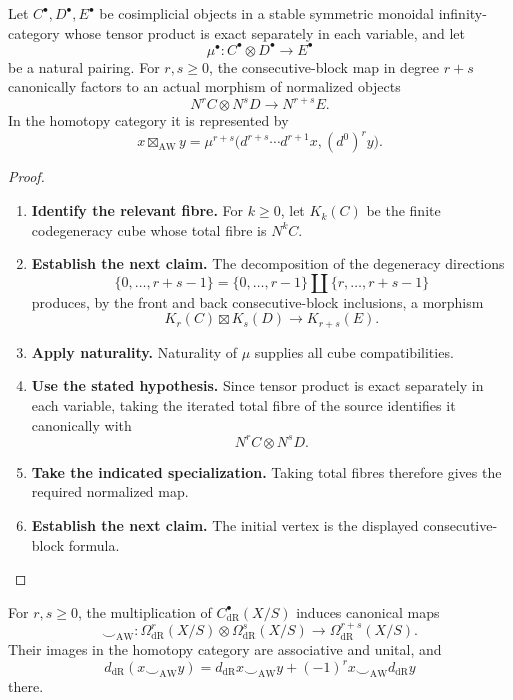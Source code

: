 \begin{lemma}
\label{lem:consecutive-block-factorization}
Let \(C^\bullet,D^\bullet,E^\bullet\) be cosimplicial objects in a stable symmetric
monoidal infinity-category whose tensor product is exact separately in each
variable, and let
\[
  \mu^\bullet:C^\bullet\otimes D^\bullet\to E^\bullet
\]
be a natural pairing. For \(r,s\geq0\), the consecutive-block map in degree
\(r+s\) canonically factors to an actual morphism of normalized objects
\[
  N^rC\otimes N^sD
  \longrightarrow
  N^{r+s}E.
\]
In the homotopy category it is represented by
\[
  x\boxtimes_{\mathrm{AW}}y
  =
  \mu^{r+s}
  \bigl(d^{r+s}\cdots d^{r+1}x,(d^0)^ry\bigr).
\]
\end{lemma}

\begin{proof}
\leavevmode
\begin{enumerate}[label=\textup{(\arabic*)}]
    \item \textbf{Identify the relevant fibre.}
    For \(k\geq0\), let \(K_k(C)\) be the finite codegeneracy cube whose total fibre
    is \(N^kC\).
    \item \textbf{Establish the next claim.}
    The decomposition of the degeneracy directions
    \[
    \{0,\ldots,r+s-1\}
    =
    \{0,\ldots,r-1\}
    \amalg
    \{r,\ldots,r+s-1\}
    \]
    produces, by the front and back consecutive-block inclusions, a morphism
    \[
    K_r(C)\boxtimes K_s(D)
    \longrightarrow
    K_{r+s}(E).
    \]
    \item \textbf{Apply naturality.}
    Naturality of \(\mu\) supplies all cube compatibilities.
    \item \textbf{Use the stated hypothesis.}
    Since tensor product is
    exact separately in each variable, taking the iterated total fibre of the source
    identifies it canonically with
    \[
    N^rC\otimes N^sD.
    \]
    \item \textbf{Take the indicated specialization.}
    Taking total fibres therefore gives the required normalized map.
    \item \textbf{Establish the next claim.}
    The initial
    vertex is the displayed consecutive-block formula.
\end{enumerate}
\end{proof}

\begin{theorem}
\label{thm:aw-product-expanded}
For \(r,s\geq0\), the multiplication of \(C^\bullet_{\mathrm{dR}}(X/S)\) induces canonical maps
\[
  \smile_{\mathrm{AW}}:
  \Omega^r_{\mathrm{dR}}(X/S)\otimes\Omega^s_{\mathrm{dR}}(X/S)
  \longrightarrow
  \Omega^{r+s}_{\mathrm{dR}}(X/S).
\]
Their images in the homotopy category are associative and unital, and
\[
  d_{\mathrm{dR}}(x\smile_{\mathrm{AW}}y)
  =
  d_{\mathrm{dR}}x\smile_{\mathrm{AW}}y
  +(-1)^r x\smile_{\mathrm{AW}}d_{\mathrm{dR}}y
\]
there.
\end{theorem}

